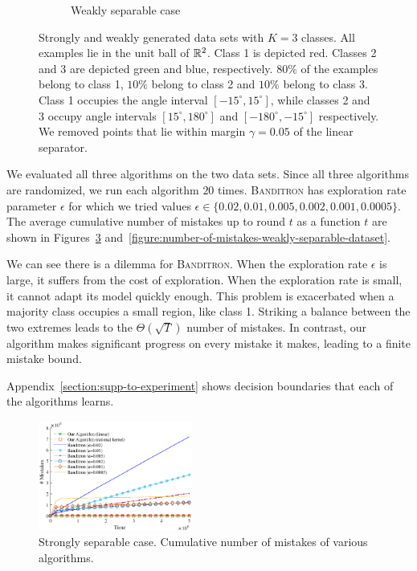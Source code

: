 \begin{figure}[h]
\begin{subfigure}[b]{0.23\textwidth}
\caption{Weakly separable case}
\label{figure:weakly-separable-dataset}
\end{subfigure}
\vspace*{-0.2cm}
\caption{Strongly and weakly generated data sets with $K=3$ classes. All
examples lie in the unit ball of $\mathbb{R}^2$. Class 1 is depicted red. Classes 2 and
3 are depicted green and blue, respectively. $80\%$ of the examples belong to class 1,
$10\%$ belong to class 2 and $10\%$ belong to class 3. Class 1
occupies the angle interval $[-15^\circ, 15^\circ]$, while classes 2 and 3
occupy angle intervals $[15^\circ, 180^\circ]$ and $[-180^\circ, -15^\circ]$
respectively. We removed points that lie within margin $\gamma=0.05$ of the
linear separator.}
\label{figure:strongly-and-weakly-separable-datasets}
\end{figure}

We evaluated all three algorithms on the two data sets. Since all three
algorithms are randomized, we run each algorithm $20$ times. \textsc{Banditron}
has exploration rate parameter $\epsilon$ for which we tried values $\epsilon
\in \{0.02, 0.01, 0.005, 0.002, 0.001, 0.0005 \}$. The average cumulative number
of mistakes up to round $t$ as a function $t$ are shown in
Figures~\ref{figure:number-of-mistakes-strongly-separable-dataset}
and~\ref{figure:number-of-mistakes-weakly-separable-dataset}.

We can see there is a dilemma for \textsc{Banditron}. When the
exploration rate $\epsilon$ is large, it suffers from the cost of exploration.
When the exploration rate is small, it cannot adapt its model quickly enough.
This problem is exacerbated when a majority class occupies a small region, like
class 1. Striking a balance between the two extremes leads to the
$\Theta(\sqrt{T})$ number of mistakes. In contrast, our algorithm makes
significant progress on every mistake it makes, leading to a finite mistake
bound.

Appendix~\ref{section:supp-to-experiment} shows decision boundaries
that each of the algorithms learns.

\begin{figure}
\centering
\includegraphics[width=0.45\textwidth]{figures/strong3}
\caption{Strongly separable case. Cumulative number of mistakes of various algorithms.}
\label{figure:number-of-mistakes-strongly-separable-dataset}
\end{figure}

